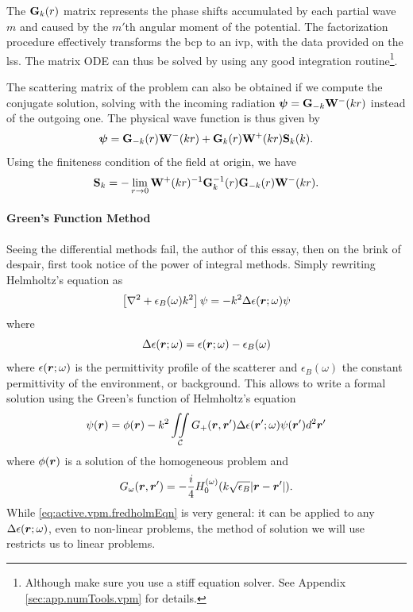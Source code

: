The $\mathbf{G}_k(r)$ matrix represents the phase shifts accumulated by each partial wave $m$ 
and caused by the $m'$th angular moment of the potential. The factorization procedure 
effectively transforms the \gls{bcp} to an \gls{ivp}, with the data provided on the 
\gls{lss}. The matrix ODE can thus be solved by using any good integration routine\footnote{Although
make sure you use a stiff equation solver. See Appendix \ref{sec:app.numTools.vpm} for details.}.

The scattering matrix of the problem can also be obtained if we 
compute the conjugate solution, solving with the incoming radiation $\boldsymbol{\psi}=\mathbf{G}_{-k}\mathbf{W}^-(kr)$
instead of the outgoing one. The physical wave function is thus given by 
	\begin{equation}
		\boldsymbol{\psi} = \mathbf{G}_{-k}(r)\mathbf{W}^-(kr)+\mathbf{G}_k(r)\mathbf{W}^+(kr)\mathbf{S}_k(k).
	\end{equation}
Using the finiteness condition of the field at origin, we have
	\begin{equation}
		\mathbf{S}_k = -\lim_{r\rightarrow0}\mathbf{W}^{+}(kr)^{-1}\mathbf{G}_k^{-1}(r)\mathbf{G}_{-k}(r)\mathbf{W}^-(kr).
	\end{equation}

\paragraph{Green's Function Method}
Seeing the differential methods fail, the author of this essay, 
then on the brink of despair, first took notice of the 
power of integral methods. Simply rewriting Helmholtz's 
equation as
  \begin{equation}
   \left[\nabla^2+\epsilon_B(\omega)k^2\right]\psi=-k^2\Delta\epsilon(\boldsymbol{r};\omega)\psi
  \end{equation}
where 
  \begin{equation}
  \Delta\epsilon(\boldsymbol{r};\omega)=\epsilon(\boldsymbol{r};\omega)-\epsilon_B(\omega)
  \end{equation}
where $\epsilon(\boldsymbol{r};\omega)$ is the permittivity profile of the scatterer
and $\epsilon_B(\omega)$ the constant permittivity of the environment, or background.
This allows to write a formal solution using the Green's function of Helmholtz's equation
  \begin{equation}
  	\label{eq:active.vpm.fredholmEqn}
  	\psi(\boldsymbol{r}) = \phi(\boldsymbol{r}) - k^2\mathop{\iint}_\mathcal{C}G_{+}(\boldsymbol{r},\boldsymbol{r}')\Delta\epsilon(\boldsymbol{r}';\omega)\psi(\boldsymbol{r}')d^2\boldsymbol{r}'
  \end{equation}
where $\phi(\boldsymbol{r})$ is a solution of the homogeneous problem and
  \begin{equation}
  	G_\omega(\boldsymbol{r},\boldsymbol{r}') = -\frac{i}{4}H_0^{(\omega)}(k\sqrt{\epsilon_B}|\boldsymbol{r}-\boldsymbol{r}'|).
  \end{equation}
While \eqref{eq:active.vpm.fredholmEqn} is very general: it can be applied to 
any $\Delta\epsilon(\boldsymbol{r};\omega)$, even to non-linear problems, 
the method of solution we will use restricts us to linear problems.

